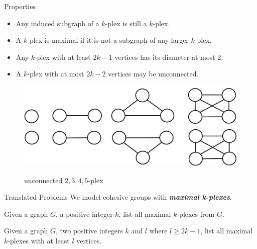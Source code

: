 \documentclass[9pt,notheorems]{beamer} %
\begin{document}
\begin{frame}{Properties}
    \begin{lemma}
        \begin{itemize}
            \item Any induced subgraph of a $k$-plex is still a $k$-plex.
            \item A $k$-plex is maximal if it is not a subgraph of any larger $k$-plex.
        \end{itemize}
    \end{lemma}
    \begin{lemma}
        \begin{itemize}
            \item Any $k$-plex with at least $2k-1$ vertices has its diameter at most 2.
            \item A $k$-plex with at most $2k-2$ vertices may be unconnected.
        \end{itemize}
    \end{lemma}
    \begin{figure}[h]
        \centering
        \includegraphics[width=0.5\linewidth]{pic/unconnected.pdf}\\
        \caption{unconnected $2,3,4,5$-plex}
    \end{figure}
\end{frame}
\begin{frame}{Translated Problems}
    We model cohesive groups with \textbf{\emph{maximal k-plexes}}.
    
    \begin{problem}
        Given a graph $G$, a positive integer $k$, list all maximal $k$-plexes from $G$.
    \end{problem}
    \begin{problem}
        Given a graph $G$, two positive integers $k$ and $l$ where $l \ge 2k-1$, list all maximal $k$-plexes with at least $l$ vertices.
    \end{problem}

\end{frame}
\end{document}
